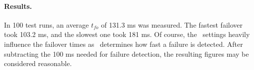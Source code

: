 

\paragraph{Results.} In 100 test runs, an average $t_{fo}$ of 131.3 ms was measured. The fastest failover took 103.2 ms, and the slowest one took 181 ms. Of course, the \liveliness\ settings heavily influence the failover times as \liveliness\ determines how fast a failure is detected. After subtracting the 100 ms needed for failure detection, the resulting figures may be considered reasonable.
%
%
%
%
%
%
%
%
%
%
%
%
%
%
%
%
%
%
%
%